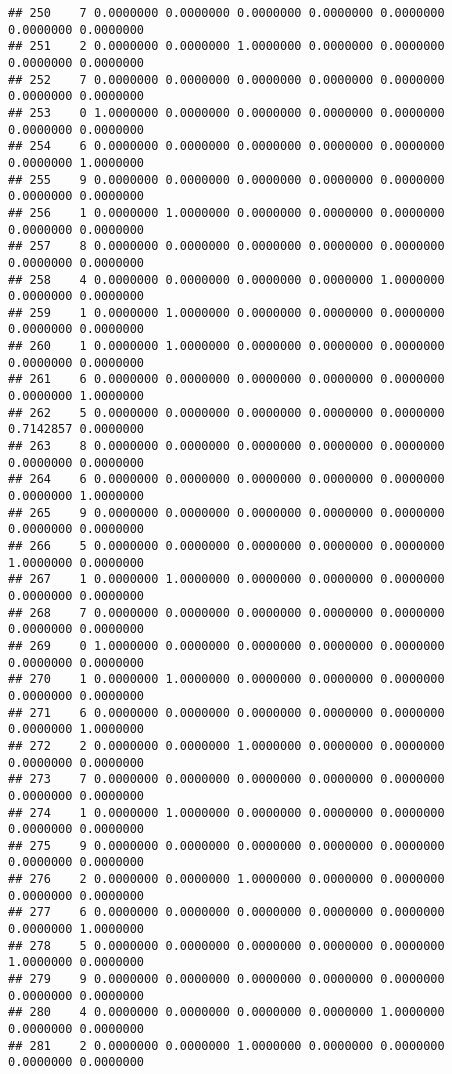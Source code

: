 \documentclass[
]{article}
\begin{document}
\begin{verbatim}
## 250    7 0.0000000 0.0000000 0.0000000 0.0000000 0.0000000 0.0000000 0.0000000
## 251    2 0.0000000 0.0000000 1.0000000 0.0000000 0.0000000 0.0000000 0.0000000
## 252    7 0.0000000 0.0000000 0.0000000 0.0000000 0.0000000 0.0000000 0.0000000
## 253    0 1.0000000 0.0000000 0.0000000 0.0000000 0.0000000 0.0000000 0.0000000
## 254    6 0.0000000 0.0000000 0.0000000 0.0000000 0.0000000 0.0000000 1.0000000
## 255    9 0.0000000 0.0000000 0.0000000 0.0000000 0.0000000 0.0000000 0.0000000
## 256    1 0.0000000 1.0000000 0.0000000 0.0000000 0.0000000 0.0000000 0.0000000
## 257    8 0.0000000 0.0000000 0.0000000 0.0000000 0.0000000 0.0000000 0.0000000
## 258    4 0.0000000 0.0000000 0.0000000 0.0000000 1.0000000 0.0000000 0.0000000
## 259    1 0.0000000 1.0000000 0.0000000 0.0000000 0.0000000 0.0000000 0.0000000
## 260    1 0.0000000 1.0000000 0.0000000 0.0000000 0.0000000 0.0000000 0.0000000
## 261    6 0.0000000 0.0000000 0.0000000 0.0000000 0.0000000 0.0000000 1.0000000
## 262    5 0.0000000 0.0000000 0.0000000 0.0000000 0.0000000 0.7142857 0.0000000
## 263    8 0.0000000 0.0000000 0.0000000 0.0000000 0.0000000 0.0000000 0.0000000
## 264    6 0.0000000 0.0000000 0.0000000 0.0000000 0.0000000 0.0000000 1.0000000
## 265    9 0.0000000 0.0000000 0.0000000 0.0000000 0.0000000 0.0000000 0.0000000
## 266    5 0.0000000 0.0000000 0.0000000 0.0000000 0.0000000 1.0000000 0.0000000
## 267    1 0.0000000 1.0000000 0.0000000 0.0000000 0.0000000 0.0000000 0.0000000
## 268    7 0.0000000 0.0000000 0.0000000 0.0000000 0.0000000 0.0000000 0.0000000
## 269    0 1.0000000 0.0000000 0.0000000 0.0000000 0.0000000 0.0000000 0.0000000
## 270    1 0.0000000 1.0000000 0.0000000 0.0000000 0.0000000 0.0000000 0.0000000
## 271    6 0.0000000 0.0000000 0.0000000 0.0000000 0.0000000 0.0000000 1.0000000
## 272    2 0.0000000 0.0000000 1.0000000 0.0000000 0.0000000 0.0000000 0.0000000
## 273    7 0.0000000 0.0000000 0.0000000 0.0000000 0.0000000 0.0000000 0.0000000
## 274    1 0.0000000 1.0000000 0.0000000 0.0000000 0.0000000 0.0000000 0.0000000
## 275    9 0.0000000 0.0000000 0.0000000 0.0000000 0.0000000 0.0000000 0.0000000
## 276    2 0.0000000 0.0000000 1.0000000 0.0000000 0.0000000 0.0000000 0.0000000
## 277    6 0.0000000 0.0000000 0.0000000 0.0000000 0.0000000 0.0000000 1.0000000
## 278    5 0.0000000 0.0000000 0.0000000 0.0000000 0.0000000 1.0000000 0.0000000
## 279    9 0.0000000 0.0000000 0.0000000 0.0000000 0.0000000 0.0000000 0.0000000
## 280    4 0.0000000 0.0000000 0.0000000 0.0000000 1.0000000 0.0000000 0.0000000
## 281    2 0.0000000 0.0000000 1.0000000 0.0000000 0.0000000 0.0000000 0.0000000

\end{verbatim}
\end{document}
